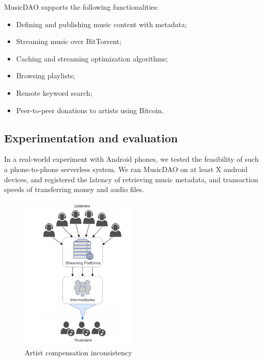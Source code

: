 MusicDAO supports the following functionalities:
\begin{itemize}
    \item Defining and publishing music content with metadata;
    \item Streaming music over BitTorrent;
    \item Caching and streaming optimization algorithms;
    \item Browsing playlists;
    \item Remote keyword search;
    \item Peer-to-peer donations to artists using Bitcoin.
\end{itemize}

\subsection{Experimentation and evaluation}
In a real-world experiment with Android phones, we tested the feasibility of such a phone-to-phone serverless system. We ran MusicDAO on at least X android devices, and registered the latency of retrieving music metadata, and transaction speeds of transferring money and audio files. 

\begin{figure}
	\includegraphics[width=0.5\textwidth]{introduction/problem-image.png}
	\caption{Artist compensation inconsistency}
\end{figure}

